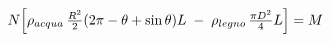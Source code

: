 \documentclass[preview]{standalone}
\begin{document}
\begin{align*}
N \Bigl[ \rho_{acqua}\,\tfrac{R^2}{2}(2\pi-\theta+\sin\theta)L \;-\; \rho_{legno}\,\tfrac{\pi D^2}{4}L \Bigr] = M
\end{align*}
\end{document}
